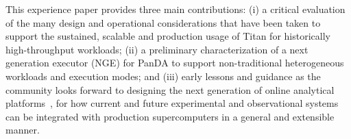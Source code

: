 
This experience paper provides three main contributions:  (i) a critical
evaluation of the many design and operational considerations that have been
taken to support the sustained, scalable and production usage of Titan for
historically high-throughput workloads; (ii) a preliminary characterization of a
next generation executor (NGE) for PanDA to support non-traditional
heterogeneous workloads and execution modes;  and (iii) early lessons and
guidance as the community looks forward to designing the next generation of
online analytical platforms~\cite{foap-url}, for how current and future
experimental and observational systems can be integrated with production
supercomputers in a general and extensible manner.
